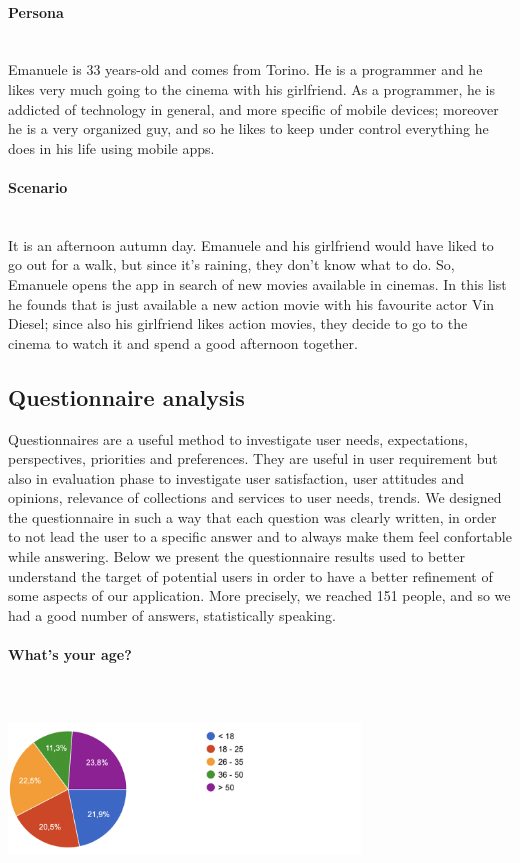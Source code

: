 \documentclass[12pt, a4paper]{article}
\begin{document}
\paragraph{Persona}\mbox{}\\
Emanuele is 33 years-old and comes from Torino. He is a programmer and he likes
very much going to the cinema with his girlfriend.
As a programmer, he is addicted of technology in general, and more specific of mobile
devices; moreover he is a very organized guy, and so he likes to keep under control
everything he does in his life using mobile apps.

\paragraph{Scenario}\mbox{}\\
It is an afternoon autumn day. Emanuele and his girlfriend would have liked to go
out for a walk, but since it’s raining, they don’t know what to do. So, Emanuele opens
the app in search of new movies available in cinemas. In this list he founds that is just
available a new action movie with his favourite actor Vin Diesel; since also his
girlfriend likes action movies, they decide to go to the cinema to watch it and spend
a good afternoon together.



\subsection{Questionnaire analysis}

Questionnaires are a useful method to investigate user needs, expectations, perspectives, priorities and preferences.
They are useful in user requirement but also in evaluation phase to investigate user satisfaction, user attitudes and opinions, relevance of collections and services to user needs, trends.
We designed the questionnaire in such a way that each question was clearly written, in order to not lead the user to a specific answer and to
always make them feel confortable while answering.
Below we present the questionnaire results used to better understand the target of potential users in order to have a better refinement of
some aspects of our application.
More precisely, we reached 151 people, and so we had a good number of answers, statistically speaking.\\

\paragraph{What's your age?}\mbox{}\\\\
\includegraphics[width=0.7\textwidth]{Images/age.png}\\
\end{document}
